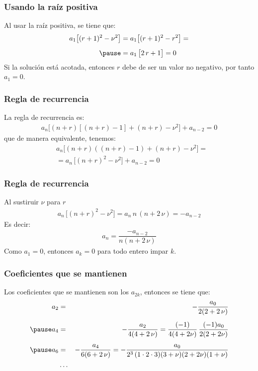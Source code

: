 \documentclass[12pt]{beamer}
\begin{document}
\begin{frame}
\frametitle{Usando la raíz positiva}
Al usar la raíz positiva, se tiene que:
\begin{eqnarray*}
\begin{aligned}
a_{1} \big[ (r + 1)^{2} - \nu^{2} \big] &= a_{1} \big[ (r + 1)^{2} - r^{2} \big] = \\[0.5em] \pause
&= a_{1} \, \big[ 2 \, r + 1 \big] = 0
\end{aligned}
\end{eqnarray*}
\pause
Si la solución está acotada, entonces $r$ debe de ser un valor no negativo, por tanto $a_{1} = 0$.
\end{frame}
\begin{frame}
\frametitle{Regla de recurrencia}
La regla de recurrencia es:
\begin{align*}
a_{n} \big[ (n + r) \left[ (n + r) - 1 \right] + (n + r) - \nu^{2} \big] + a_{n-2} = 0
\end{align*}
\pause
que de manera equivalente, tenemos:
\begin{align*}
&a_{n} \big[ (n + r) \left( (n + r) - 1 \right) + (n + r) - \nu^{2} \big] = \\[0.5em]
&= a_{n} \, \big[ (n + r)^{2} - \nu^{2} \big] + a_{n-2} = 0
\end{align*}
\end{frame}
\begin{frame}
\frametitle{Regla de recurrencia}
Al sustiruir $\nu$ para $r$
\begin{align*}
a_{n} \, \big[ (n + r)^{2} - \nu^{2} \big] = a_{n} \, n \, (n + 2 \, \nu) = - a_{n-2}
\end{align*}
\pause
Es decir:
\begin{align*}
a_{n} = \dfrac{- a_{n-2}}{n (n + 2 \, \nu)}
\end{align*}
Como $a_{1} = 0$, entonces $a_{k} = 0$ para todo entero impar $k$.
\end{frame}
\begin{frame}
\frametitle{Coeficientes que se mantienen}
Los coeficientes que se mantienen son los $a_{2 k}$, entonces se tiene que:
\fontsize{12}{12}\selectfont
\begin{eqnarray*}
a_{2} &=& - \dfrac{a_{0}}{2 (2 + 2 \, \nu)} \\[0.5em]\pause
a_{4} &=& - \dfrac{a_{2}}{4 (4 + 2 \, \nu)} = \dfrac{(-1)}{4 (4 + 2 \nu)} \, \dfrac{(-1)a_{0}}{2 (2 + 2 \nu)} \\[0.5em]\pause
a_{6} &=& - \dfrac{a_{4}}{6 (6 + 2 \, \nu)} = - \dfrac{a_{0}}{2^{3} \, (1 \cdot 2 \cdot 3) (3 + \nu)(2 + 2 \nu)(1 + \nu)}\\
&\ldots&
\end{eqnarray*}
\end{frame}
\end{document}

